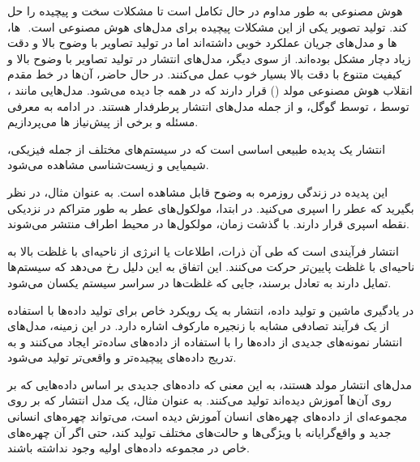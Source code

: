 
\label{فصل۱:مقدمه}

هوش مصنوعی به طور مداوم در حال تکامل است تا مشکلات سخت و پیچیده را حل کند. تولید تصویر یکی از این مشکلات پیچیده برای مدل‌های هوش مصنوعی است. ‌ ها، 
 ‌ها و مدل‌های جریان عملکرد خوبی داشته‌اند اما در تولید تصاویر با وضوح بالا و دقت زیاد دچار مشکل بوده‌اند. از سوی دیگر، مدل‌های انتشار در تولید تصاویر با وضوح بالا و کیفیت متنوع با دقت بالا بسیار خوب عمل می‌کنند. در حال حاضر، آن‌ها در خط مقدم انقلاب هوش مصنوعی مولد () قرار دارند که در همه جا دیده می‌شود. مدل‌هایی مانند ،  توسط ،  توسط گوگل، و  از جمله مدل‌های انتشار پرطرفدار هستند. در ادامه به معرفی مسئله و برخی از پیش‌نیاز ها می‌پردازیم.






انتشار یک پدیده طبیعی اساسی است که در سیستم‌های مختلف از جمله فیزیکی، شیمیایی و زیست‌شناسی مشاهده می‌شود.

این پدیده در زندگی روزمره به وضوح قابل مشاهده است. به عنوان مثال، در نظر بگیرید که عطر را اسپری می‌کنید. در ابتدا، مولکول‌های عطر به طور متراکم در نزدیکی نقطه اسپری قرار دارند. با گذشت زمان، مولکول‌ها در محیط اطراف منتشر می‌شوند.

انتشار فرآیندی است که طی آن ذرات، اطلاعات یا انرژی از ناحیه‌ای با غلظت بالا به ناحیه‌ای با غلظت پایین‌تر حرکت می‌کنند. این اتفاق به این دلیل رخ می‌دهد که سیستم‌ها تمایل دارند به تعادل برسند، جایی که غلظت‌ها در سراسر سیستم یکسان می‌شود.

در یادگیری ماشین و تولید داده، انتشار به یک رویکرد خاص برای تولید داده‌ها با استفاده از یک فرآیند تصادفی مشابه با زنجیره مارکوف اشاره دارد. در این زمینه، مدل‌های انتشار نمونه‌های جدیدی از داده‌ها را با استفاده از داده‌های ساده‌تر ایجاد می‌کنند و به تدریج داده‌های پیچیده‌تر و واقعی‌تر تولید می‌شود.







مدل‌های انتشار مولد هستند، به این معنی که داده‌های جدیدی بر اساس داده‌هایی که بر روی آن‌ها آموزش دیده‌اند تولید می‌کنند. به عنوان مثال، یک مدل انتشار که بر روی مجموعه‌ای از داده‌های چهره‌های انسان آموزش دیده است، می‌تواند چهره‌های انسانی جدید و واقع‌گرایانه با ویژگی‌ها و حالت‌های مختلف تولید کند، حتی اگر آن چهره‌های خاص در مجموعه داده‌های اولیه وجود نداشته باشند.

